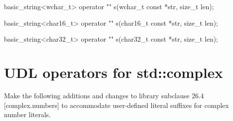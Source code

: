 \documentclass[ebook,11pt,article]{memoir}
\begin{document}
\begin{itemdescr}
\pnum
\returns
{}
\end{itemdescr}

\begin{itemdecl}
basic_string<wchar_t> operator "" s(wchar_t const *str, size_t len);
\end{itemdecl}
\begin{itemdescr}
\pnum
\returns
{}
\end{itemdescr}

\begin{itemdecl}
basic_string<char16_t> operator "" s(char16_t const *str, size_t len);
\end{itemdecl}
\begin{itemdescr}
\pnum
\returns
{}
\end{itemdescr}

\begin{itemdecl}
basic_string<char32_t> operator "" s(char32_t const *str, size_t len);
\end{itemdecl}
\begin{itemdescr}
\pnum
\returns
{}
\end{itemdescr}

\section{UDL operators for std::complex}
Make the following additions and changes to library subclause 26.4 [complex.numbers] to accommodate user-defined literal suffixes for complex number literals.
\end{document}
